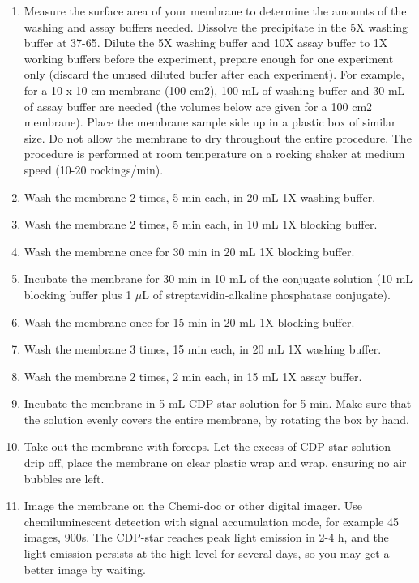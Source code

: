 \documentclass{article}
\newcommand{\mul}{\ensuremath{\mu}L\xspace}
\newcommand{\degC}{\celsius\xspace}
\begin{document}
\begin{enumerate}[resume]
  \item Measure the surface area of your membrane to determine the amounts of the washing and assay buffers needed. Dissolve the precipitate in the 5X washing buffer at 37-65\degC. Dilute the 5X washing buffer and 10X assay buffer to 1X working buffers before the experiment, prepare enough for one experiment only (discard the unused diluted buffer after each experiment). For example, for a 10 x 10 cm membrane (100 cm2), 100 mL of washing buffer and 30 mL of assay buffer are needed (the volumes below are given for a 100 cm2 membrane). Place the membrane sample side up in a plastic box of similar size. Do not allow the membrane to dry throughout the entire procedure. The procedure is performed at room temperature on a rocking shaker at medium speed (10-20 rockings/min).
\item Wash the membrane 2 times, 5 min each, in 20 mL 1X washing buffer. 
\item Wash the membrane 2 times, 5 min each, in 10 mL 1X blocking buffer.
\item Wash the membrane once for 30 min in 20 mL 1X blocking buffer. 
\item Incubate the membrane for 30 min in 10 mL of the conjugate solution (10 mL
blocking buffer plus 1 \mul of streptavidin-alkaline phosphatase conjugate).   
\item Wash the membrane once for 15 min in 20 mL 1X blocking buffer. 
\item Wash the membrane 3 times, 15 min each, in 20 mL 1X washing buffer. 
\item Wash the membrane 2 times, 2 min each, in 15 mL 1X assay buffer. 
\item Incubate the membrane in 5 mL CDP-star solution for 5 min. Make sure that the solution evenly covers the entire membrane, by rotating the box by hand. 
\item Take out the membrane with forceps. Let the excess of CDP-star solution drip off, place the membrane on clear plastic wrap and wrap, ensuring no air bubbles are left.
\item Image the membrane on the Chemi-doc or other digital imager. Use chemiluminescent detection with signal accumulation mode, for example 45 images, 900s.
The CDP-star reaches peak light emission in 2-4 h, and the light emission persists at the high level for several days, so you may get a better image by waiting.
\end{enumerate}
\end{document}

